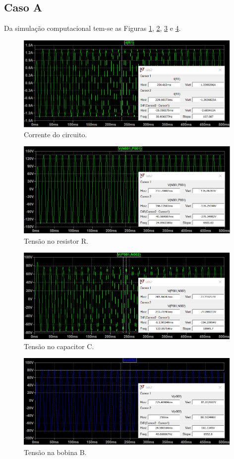 \documentclass[a4paper,12pt,oneside,openany,table,xcdraw]{article}
\begin{document}
\subsection{Caso A}
Da simulação computacional tem-se as Figuras \ref{corrente1}, \ref{tensao-R1}, \ref{tensao-C1} e \ref{tensao-B1}.
\begin{figure}[H]
\centering
\captionsetup{font=scriptsize}
\includegraphics[width=11cm]{corrente1}
\caption{Corrente do circuito.}
\label{corrente1}
\end{figure}
\begin{figure}[H]
\centering
\captionsetup{font=scriptsize}
\includegraphics[width=11cm]{tensao-R1}
\caption{Tensão no resistor R.}
\label{tensao-R1}
\end{figure}
\begin{figure}[H]
\centering
\captionsetup{font=scriptsize}
\includegraphics[width=11cm]{tensao-C1}
\caption{Tensão no capacitor C.}
\label{tensao-C1}
\end{figure}
\begin{figure}[H]
\centering
\captionsetup{font=scriptsize}
\includegraphics[width=11cm]{tensao-B1}
\caption{Tensão na bobina B.}
\label{tensao-B1}
\end{figure}
\end{document}
